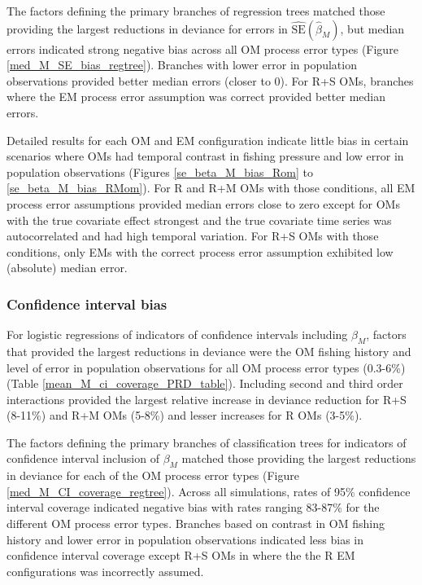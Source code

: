 \documentclass[
  12pt,
]{article}
\begin{document}
The factors defining the primary branches of regression trees matched those providing the largest reductions in deviance for errors in \(\widehat {\text{SE}}\left(\widehat\beta_M\right)\), but median errors indicated strong negative bias across all OM process error types (Figure \ref{med_M_SE_bias_regtree}). Branches with lower error in population observations provided better median errors (closer to 0). For R+S OMs, branches where the EM process error assumption was correct provided better median errors.

Detailed results for each OM and EM configuration indicate little bias in certain scenarios where OMs had temporal contrast in fishing pressure and low error in population observations (Figures \ref{se_beta_M_bias_Rom} to \ref{se_beta_M_bias_RMom}). For R and R+M OMs with those conditions, all EM process error assumptions provided median errors close to zero except for OMs with the true covariate effect strongest and the true covariate time series was autocorrelated and had high temporal variation. For R+S OMs with those conditions, only EMs with the correct process error assumption exhibited low (absolute) median error.

\subsubsection*{Confidence interval bias}\label{confidence-interval-bias-1}

For logistic regressions of indicators of confidence intervals including \(\beta_M\), factors that provided the largest reductions in deviance were the OM fishing history and level of error in population observations for all OM process error types (0.3-6\%) (Table \ref{mean_M_ci_coverage_PRD_table}). Including second and third order interactions provided the largest relative increase in deviance reduction for R+S (8-11\%) and R+M OMs (5-8\%) and lesser increases for R OMs (3-5\%).

The factors defining the primary branches of classification trees for indicators of confidence interval inclusion of \(\beta_M\) matched those providing the largest reductions in deviance for each of the OM process error types (Figure \ref{med_M_CI_coverage_regtree}). Across all simulations, rates of 95\% confidence interval coverage indicated negative bias with rates ranging 83-87\% for the different OM process error types. Branches based on contrast in OM fishing history and lower error in population observations indicated less bias in confidence interval coverage except R+S OMs in where the the R EM configurations was incorrectly assumed.
\end{document}
